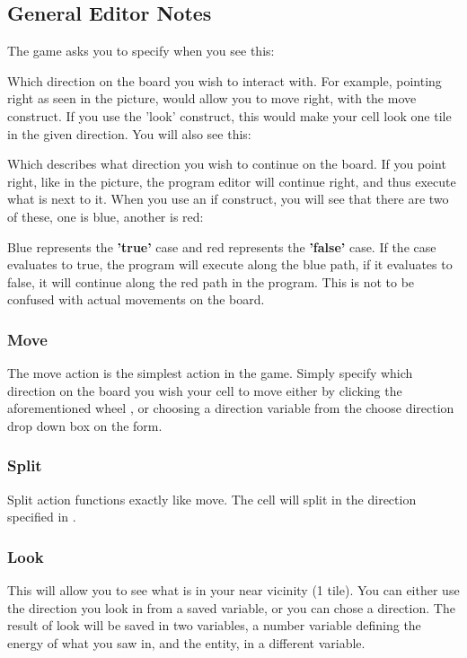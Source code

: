 \subsection{General Editor Notes}

The game asks you to specify when you see this:


Which direction on the board you wish to interact with. For example, pointing right as seen in the picture, would allow you to move right, with the move construct. If you use the 'look' construct, this would make your cell look one tile in the given direction. You will also see this:


Which describes what direction you wish to continue on the board. If you point right, like in the picture, the program editor will continue right, and thus execute what is next to it. When you use an if construct, you will see that there are two of these, one is blue, another is red:


Blue represents the \textbf{'true'} case and red represents the \textbf{'false'} case. If the case evaluates to true, the program will execute along the blue path, if it evaluates to false, it will continue along the red path in the program. This is not to be confused with actual movements on the board.

\subsubsection{Move}

The move action is the simplest action in the game. Simply specify which direction on the board you wish your cell to move either by clicking the aforementioned wheel , or choosing a direction variable from the choose direction drop down box on the form.

\subsubsection{Split}

Split action functions exactly like move. The cell will split in the direction specified in .

\subsubsection{Look}

This will allow you to see what is in your near vicinity (1 tile). You can either use the direction you look in from a saved variable, or you can chose a direction. The result of look will be saved in two variables, a number variable defining the energy of what you saw in, and the entity, in a different variable.

